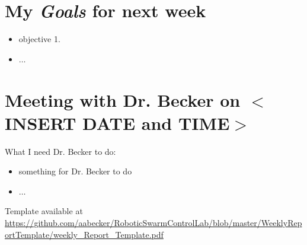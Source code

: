 \section{My \emph{Goals} for next week}

\begin{itemize}
\item objective 1. 
\item $\ldots$
\end{itemize}

\section{Meeting with Dr. Becker on $<$INSERT DATE and TIME$>$}

What I need Dr. Becker to do:
\begin{itemize}
\item something for Dr. Becker to do
\item $\ldots$
\end{itemize}

{\tiny
Template available at \href{https://github.com/aabecker/RoboticSwarmControlLab/blob/master/WeeklyReportTemplate/weekly_Report_Template.pdf}{https://github.com/aabecker/RoboticSwarmControlLab/blob/master/WeeklyReportTemplate/weekly\_Report\_Template.pdf}
}

